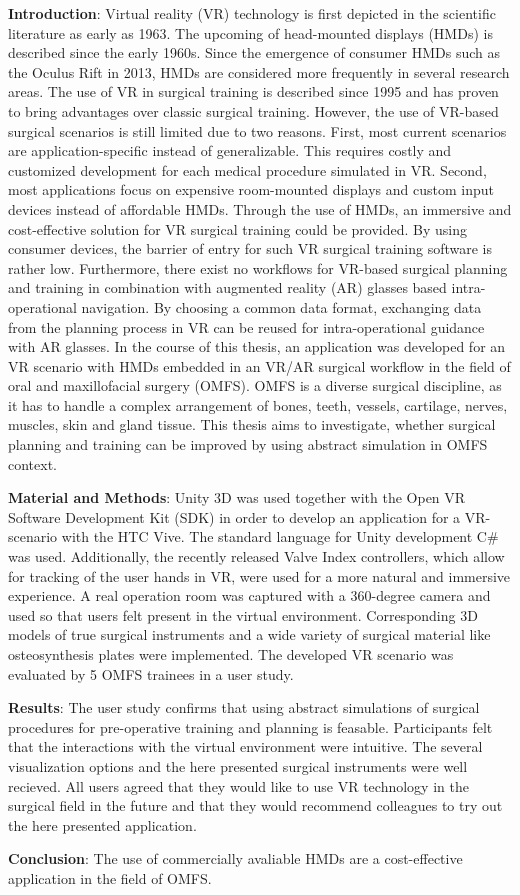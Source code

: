 \textbf{Introduction}: Virtual reality (VR) technology is first depicted in the scientific literature as early as 1963.
The upcoming of head-mounted displays (HMDs) is described since the early 1960s.
Since the emergence of consumer HMDs such as the Oculus Rift in 2013, HMDs are considered more frequently in several research areas.
The use of VR in surgical training is described since 1995 and has proven to bring advantages over classic surgical training.
However, the use of VR-based surgical scenarios is still limited due to two reasons.
First, most current scenarios are application-specific instead of generalizable.
This requires costly and customized development for each medical procedure simulated in VR.
Second, most applications focus on expensive room-mounted displays and custom input devices instead of affordable HMDs.
Through the use of HMDs, an immersive and cost-effective solution for VR surgical training could be provided.
By using consumer devices, the barrier of entry for such VR surgical training software is rather low.
Furthermore, there exist no workflows for VR-based surgical planning and training in combination with augmented reality (AR) glasses based intra-operational navigation.
By choosing a common data format, exchanging data from the planning process in VR can be reused for intra-operational guidance with AR glasses.
In the course of this thesis, an application was developed for an VR scenario with HMDs embedded in an VR/AR surgical workflow in 
the field of oral and maxillofacial surgery (OMFS).
OMFS is a diverse surgical discipline, as it has to handle 
a complex arrangement of bones, teeth, vessels, cartilage, nerves, muscles,
skin and gland tissue. This thesis aims to investigate,
whether surgical planning and training can be improved by using
abstract simulation in OMFS context.

\textbf{Material and Methods}: Unity 3D was used together with the Open VR Software Development Kit (SDK) in order to develop an application for a VR-scenario with the HTC Vive.
The standard language for Unity development C\# was used. 
Additionally, the recently released Valve Index controllers, which allow for tracking of the user hands in VR, were used for a more natural and immersive experience.
A real operation room was captured with a 360-degree camera and used so that users felt present in the virtual environment.
Corresponding 3D models of true surgical instruments and a wide variety of surgical material like osteosynthesis plates were implemented.
The developed VR scenario was evaluated by 5 OMFS trainees in a user study.

\textbf{Results}: The user study confirms that using abstract simulations of surgical procedures for pre-operative training and planning is feasable.
Participants felt that the interactions with the virtual environment were intuitive.
The several visualization options and the here presented surgical instruments were well recieved.
All users agreed that they would like to use VR technology in the surgical field in the future and that they would recommend colleagues to try out the here presented
application. 

\textbf{Conclusion}: The use of commercially avaliable HMDs are a cost-effective application in the field of OMFS.